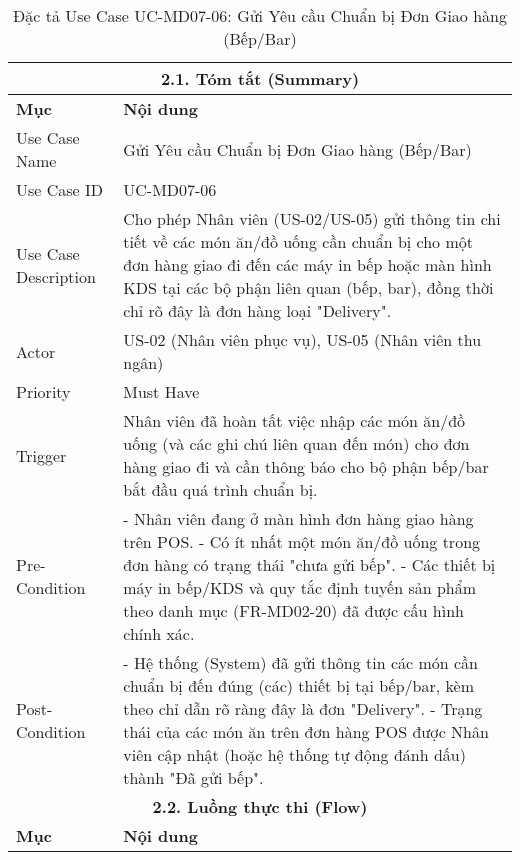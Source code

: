 \begin{longtable}{|m{4cm}|p{11cm}|}
\caption{Đặc tả Use Case UC-MD07-06: Gửi Yêu cầu Chuẩn bị Đơn Giao hàng (Bếp/Bar)} \label{tab:uc_md07_06_final_full} \\
\hline
\multicolumn{2}{|c|}{\textbf{2.1. Tóm tắt (Summary)}} \\
\hline
\textbf{Mục} & \textbf{Nội dung} \\
\hline
\endhead %
\hline
\endfoot %
\hline
\endlastfoot %
Use Case Name & Gửi Yêu cầu Chuẩn bị Đơn Giao hàng (Bếp/Bar) \\
\hline
Use Case ID & UC-MD07-06 \\
\hline
Use Case Description & Cho phép Nhân viên (US-02/US-05) gửi thông tin chi tiết về các món ăn/đồ uống cần chuẩn bị cho một đơn hàng giao đi đến các máy in bếp hoặc màn hình KDS tại các bộ phận liên quan (bếp, bar), đồng thời chỉ rõ đây là đơn hàng loại "Delivery". \\
\hline
Actor & US-02 (Nhân viên phục vụ), US-05 (Nhân viên thu ngân) \\
\hline
Priority & Must Have \\
\hline
Trigger & Nhân viên đã hoàn tất việc nhập các món ăn/đồ uống (và các ghi chú liên quan đến món) cho đơn hàng giao đi và cần thông báo cho bộ phận bếp/bar bắt đầu quá trình chuẩn bị. \\
\hline
Pre-Condition & - Nhân viên đang ở màn hình đơn hàng giao hàng trên POS. \newline - Có ít nhất một món ăn/đồ uống trong đơn hàng có trạng thái "chưa gửi bếp". \newline - Các thiết bị máy in bếp/KDS và quy tắc định tuyến sản phẩm theo danh mục (FR-MD02-20) đã được cấu hình chính xác. \\
\hline
Post-Condition & - Hệ thống (System) đã gửi thông tin các món cần chuẩn bị đến đúng (các) thiết bị tại bếp/bar, kèm theo chỉ dẫn rõ ràng đây là đơn "Delivery". \newline - Trạng thái của các món ăn trên đơn hàng POS được Nhân viên cập nhật (hoặc hệ thống tự động đánh dấu) thành "Đã gửi bếp". \\
\hline
\multicolumn{2}{|c|}{\textbf{2.2. Luồng thực thi (Flow)}} \\
\hline
\textbf{Mục} & \textbf{Nội dung} \\
\hline

\end{longtable}
